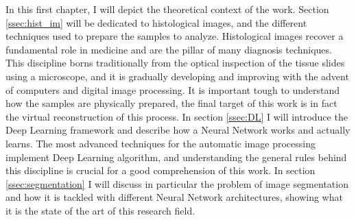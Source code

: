 In this first chapter, I will depict the theoretical context of the work. Section \ref{ssec:hist_im} will be dedicated to histological images, and the different techniques used to prepare the samples to analyze. Histological images recover a fundamental role in medicine and are the pillar of many diagnosis techniques. This discipline borns traditionally from the optical inspection of the tissue slides using a microscope, and it is gradually developing and improving with the advent of computers and digital image processing. It is important tough to understand how the samples are physically prepared, the final target of this work is in fact the virtual reconstruction of this process. In section \ref{ssec:DL} I will introduce the Deep Learning framework and describe how a Neural Network works and actually learns. The most advanced techniques for the automatic image processing implement Deep Learning algorithm, and understanding the general rules behind this discipline is crucial for a good comprehension of this work. In section \ref{ssec:segmentation} I will discuss in particular the problem of image segmentation and how it is tackled with different Neural Network architectures, showing what it is the state of the art of this research field.
